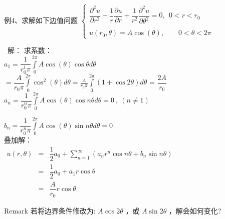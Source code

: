 \begin{frame}	
	\begin{exampleblock} { 例4、求解如下边值问题}
	{ $  \displaystyle  \left \{ 
	\begin{array}{cc}
		\displaystyle {	\dfrac{\partial^2 u }{\partial r^2 } +\dfrac{1}{r } \dfrac{\partial u }{\partial r } +
		\dfrac{1}{r^2 } \dfrac{\partial ^2 u }{\partial \theta ^2
		} } =0, ~~ 0<r<r_0\\
		\\
		u(r_0,\theta )=A\cos(\theta),~~~~~~~~~ 0<\theta <2\pi 
	\end{array}
	\right. $}  
	\end{exampleblock}	
	\alert{ 解：}	 求系数：\\
	$  \displaystyle  a_1 = \dfrac{1}{r_0 ^1 \pi }  \int\limits_{0}^{2\pi} A\cos(\theta) \cos  \theta d\theta  $ \\ 	
	\hspace{0.8cm}$  \displaystyle  = \dfrac{A}{r_0  \pi }  \int\limits_{0}^{2\pi} \cos ^2 (\theta)  d\theta  = \frac{A}{r_0 \pi }  \int\limits_{0}^{2\pi} (1+\cos2\theta) d\theta$ = $\dfrac{2A}{r_0}$ \\ 
	$  \displaystyle  a_n = \dfrac{1}{r_0 ^n \pi }  \int\limits_{0}^{2\pi} A\cos(\theta) \cos n \theta d\theta =0~,~ (n\ne 1)$ \\ 
\end{frame}	

\begin{frame}	
	$  \displaystyle  b_n = \dfrac{1}{r_0 ^n \pi }  \int\limits_{0}^{2\pi} A\cos(\theta) \sin n \theta d\theta =0 $  \\ 
	叠加解：\\
	$\begin{array}{llll}
		u(r, \theta) &=& \dfrac{1}{2} a_0 +\sum\limits_{n=1}^{\infty } (a_n r^n\cos n\theta +b_n \sin n \theta )  \\
		&=& \dfrac{1}{2} a_0+ a_1 r\cos \theta \\
		&=&  \dfrac{A}{r_0} r \cos \theta 
	\end{array}$ \\ 
	\begin{block}{Remark}
		若将边界条件修改为: $A \cos 2\theta$ ，或 $A \sin 2\theta $ ，解会如何变化?
	\end{block}
\end{frame}	

